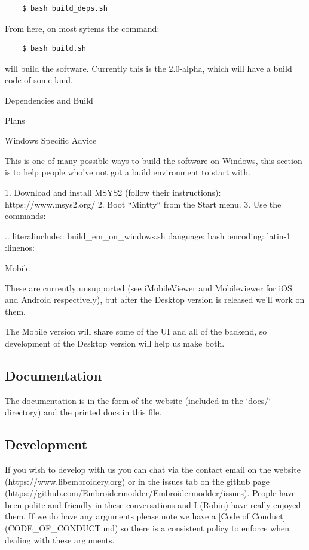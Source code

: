 \documentclass[a4paper]{report}
\begin{document}
\begin{lstlisting}
    $ bash build_deps.sh
\end{lstlisting}

From here, on most sytems the command:

\begin{lstlisting}
    $ bash build.sh
\end{lstlisting}

will build the software. Currently this is the 2.0-alpha, which will have a build code of
some kind.

Dependencies and Build
~~~~~~~~~~~~~~~~~~~~~~

Plans
~~~~~

Windows Specific Advice
~~~~~~~~~~~~~~~~~~~~~~~

This is one of many possible ways to build the software on Windows,
this section is to help people who've not got a build environment to start with.

1. Download and install MSYS2 (follow their instructions): https://www.msys2.org/
2. Boot ``Mintty`` from the Start menu.
3. Use the commands:

.. literalinclude:: build\_em\_on\_windows.sh
   :language: bash
   :encoding: latin-1
   :linenos:

Mobile
~~~~~~

These are currently unsupported (see iMobileViewer and Mobileviewer for
iOS and Android respectively), but after the Desktop version is
released we'll work on them.

The Mobile version will share some of the UI and all of the backend,
so development of the Desktop version will help us make both.

\subsection{Documentation}

The documentation is in the form of the website (included in the `docs/`
directory) and the printed docs in this file.

\subsection{Development}

If you wish to develop with us you can chat via the contact email
on the website (https://www.libembroidery.org) or in the issues tab on the
github page (https://github.com/Embroidermodder/Embroidermodder/issues).
People have been polite and friendly in these conversations and I (Robin)
have really enjoyed them.
If we do have any arguments please note we have a
[Code of Conduct](CODE\_OF\_CONDUCT.md) so there is a consistent policy to
enforce when dealing with these arguments.
\end{document}
